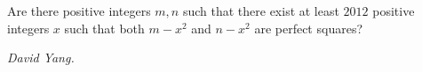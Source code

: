 Are there positive integers $m,n$ such that there exist at least $2012$ positive integers $x$ such that both $m-x^2$ and $n-x^2$ are perfect squares?

\textit{David Yang.}